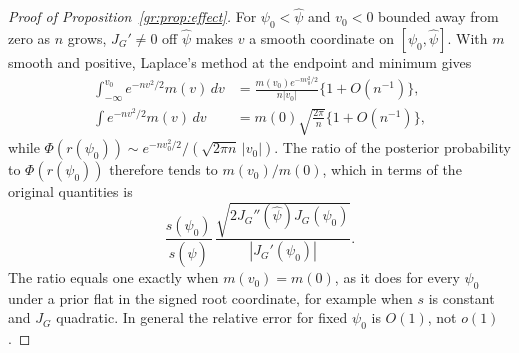 \begin{proof}[Proof of Proposition~\ref{gr:prop:effect}]
For $\psi_0<\hat\psi$ and $v_0<0$ bounded away from zero as $n$ grows, $J_G'\neq0$ off $\hat\psi$ makes $v$ a smooth coordinate on $[\psi_0,\hat\psi]$. With $m$ smooth and positive, Laplace's method at the endpoint and minimum gives
\begin{align*}
\int_{-\infty}^{v_0}e^{-nv^2/2}m(v)\,dv&=\frac{m(v_0)e^{-nv_0^2/2}}{n|v_0|}\{1+O(n^{-1})\},\\
\int e^{-nv^2/2}m(v)\,dv&=m(0)\sqrt{\frac{2\pi}n}\{1+O(n^{-1})\},
\end{align*}
while $\Phi(r(\psi_0))\sim e^{-nv_0^2/2}/(\sqrt{2\pi n}\,|v_0|)$. The ratio of the posterior probability to $\Phi(r(\psi_0))$ therefore tends to $m(v_0)/m(0)$, which in terms of the original quantities is
\[
\frac{s(\psi_0)}{s(\hat\psi)}\,\frac{\sqrt{2J_G''(\hat\psi)J_G(\psi_0)}}{|J_G'(\psi_0)|}.
\]
The ratio equals one exactly when $m(v_0)=m(0)$, as it does for every $\psi_0$ under a prior flat in the signed root coordinate, for example when $s$ is constant and $J_G$ quadratic. In general the relative error for fixed $\psi_0$ is $O(1)$, not $o(1)$.
\end{proof}



